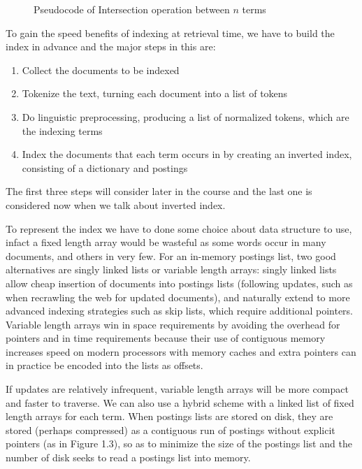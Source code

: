 \begin{figure}
    \caption{Pseudocode of Intersection operation between $n$ terms}
    \label{alg:intersectionTerms}
    \begin{codebox}
        
    \end{codebox}
\end{figure}
To gain the speed benefits of indexing at retrieval time, we have to build the index in advance
and the major steps in this are:
\begin{enumerate}
    \item Collect the documents to be indexed
    \item Tokenize the text, turning each document into a list of tokens
    \item Do linguistic preprocessing, producing a list of normalized tokens, which are the indexing terms
    \item Index the documents that each term occurs in by creating an inverted index,
          consisting of a dictionary and postings
\end{enumerate}
The first three steps will consider later in the course and the last one is considered now when we talk about 
inverted index.

To represent the index we have to done some choice about data structure to use, infact 
a fixed length array would be wasteful as some words occur in many documents, and others in very few.\newline
For an in-memory postings list, two good alternatives are singly linked lists or variable length arrays:
singly linked lists allow cheap insertion of documents into postings lists (following updates,
such as when recrawling the web for updated documents), and naturally extend to more advanced indexing strategies
such as skip lists, which require additional pointers.\newline
Variable length arrays win in space requirements by avoiding the overhead for pointers and in
time requirements because their use of contiguous memory increases speed on modern processors with memory caches
and extra pointers can in practice be encoded into the lists as offsets.

If updates are relatively infrequent, variable
length arrays will be more compact and faster to traverse. We can also use a
hybrid scheme with a linked list of fixed length arrays for each term. When
postings lists are stored on disk, they are stored (perhaps compressed) as a
contiguous run of postings without explicit pointers (as in Figure 1.3), so as
to minimize the size of the postings list and the number of disk seeks to read
a postings list into memory.

